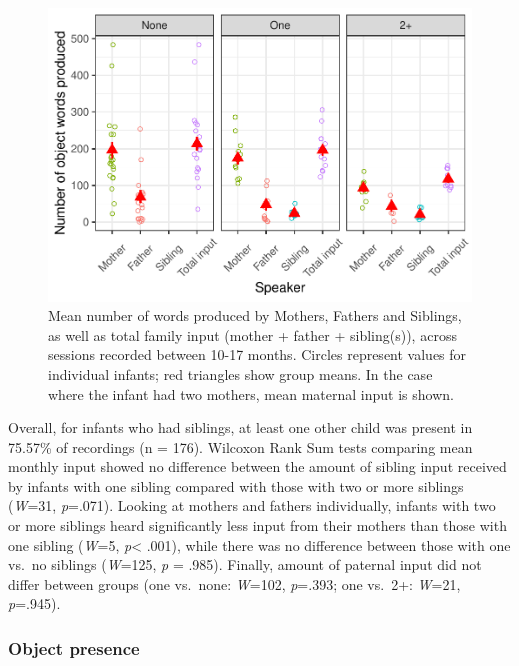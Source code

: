 \documentclass[
  man,mask,floatsintext]{apa6}
\begin{document}
\begin{figure}
\centering
\includegraphics{SiblingsStudyText-anon-revisions_files/figure-latex/Figure-Speaker-count-1.pdf}
\caption{\label{fig:Figure-Speaker-count}Mean number of words produced by Mothers, Fathers and Siblings, as well as total family input (mother + father + sibling(s)), across sessions recorded between 10-17 months. Circles represent values for individual infants; red triangles show group means. In the case where the infant had two mothers, mean maternal input is shown.}
\end{figure}

Overall, for infants who had siblings, at least one other child was present in 75.57\% of recordings (n = 176). Wilcoxon Rank Sum tests comparing mean monthly input showed no difference between the amount of sibling input received by infants with one sibling compared with those with two or more siblings (\emph{W}=31, \emph{p}=.071). Looking at mothers and fathers individually, infants with two or more siblings heard significantly less input from their mothers than those with one sibling (\emph{W}=5, \emph{p}\textless{} .001), while there was no difference between those with one vs.~no siblings (\emph{W}=125, \emph{p} = .985). Finally, amount of paternal input did not differ between groups (one vs.~none: \emph{W}=102, \emph{p}=.393; one vs.~2+: \emph{W}=21, \emph{p}=.945).

\hypertarget{object-presence}{%
\subsubsection{Object presence}\label{object-presence}}
\end{document}
